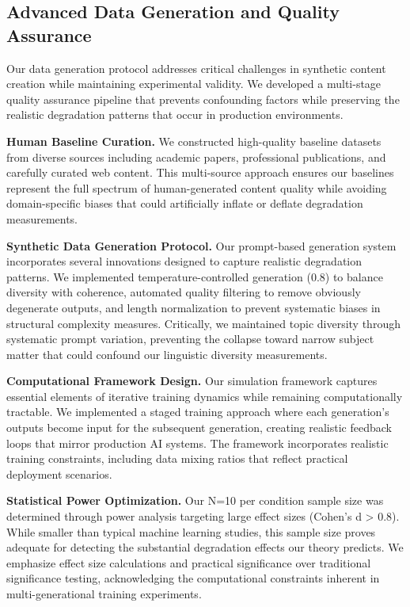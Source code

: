 \documentclass{article}
\begin{document}
\subsection{Advanced Data Generation and Quality Assurance}

Our data generation protocol addresses critical challenges in synthetic content creation while maintaining experimental validity. We developed a multi-stage quality assurance pipeline that prevents confounding factors while preserving the realistic degradation patterns that occur in production environments.

\textbf{Human Baseline Curation.} We constructed high-quality baseline datasets from diverse sources including academic papers, professional publications, and carefully curated web content. This multi-source approach ensures our baselines represent the full spectrum of human-generated content quality while avoiding domain-specific biases that could artificially inflate or deflate degradation measurements.

\textbf{Synthetic Data Generation Protocol.} Our prompt-based generation system incorporates several innovations designed to capture realistic degradation patterns. We implemented temperature-controlled generation (0.8) to balance diversity with coherence, automated quality filtering to remove obviously degenerate outputs, and length normalization to prevent systematic biases in structural complexity measures. Critically, we maintained topic diversity through systematic prompt variation, preventing the collapse toward narrow subject matter that could confound our linguistic diversity measurements.

\textbf{Computational Framework Design.} Our simulation framework captures essential elements of iterative training dynamics while remaining computationally tractable. We implemented a staged training approach where each generation's outputs become input for the subsequent generation, creating realistic feedback loops that mirror production AI systems. The framework incorporates realistic training constraints, including data mixing ratios that reflect practical deployment scenarios.

\textbf{Statistical Power Optimization.} Our N=10 per condition sample size was determined through power analysis targeting large effect sizes (Cohen's d > 0.8). While smaller than typical machine learning studies, this sample size proves adequate for detecting the substantial degradation effects our theory predicts. We emphasize effect size calculations and practical significance over traditional significance testing, acknowledging the computational constraints inherent in multi-generational training experiments.
\end{document}
